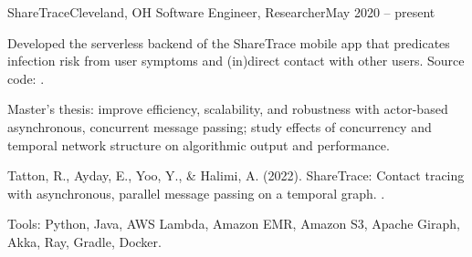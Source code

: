 \begin{ritemize}
{ShareTrace}{Cleveland, OH}
{Software Engineer, Researcher}{May 2020 -- present}
	\item Developed the serverless backend of the ShareTrace mobile app that predicates infection risk from user symptoms and (in)direct contact with other users. Source code: .
	\item Master's thesis: improve efficiency, scalability, and robustness with actor-based asynchronous, concurrent message passing; study effects of concurrency and temporal network structure on algorithmic output and performance.
	\item Tatton, R., Ayday, E., Yoo, Y., \& Halimi, A. (2022). ShareTrace: Contact tracing with asynchronous, parallel message passing on a temporal graph.
	 .
	\item Tools: Python, Java, AWS Lambda, Amazon EMR, Amazon S3, Apache Giraph, Akka, Ray, Gradle, Docker.
\end{ritemize}